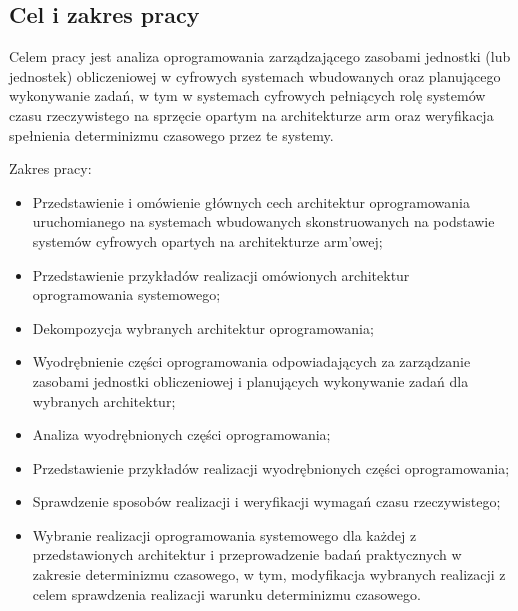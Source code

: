 \documentclass[../../main]{subfiles}
\begin{document}
\subsection{Cel i zakres pracy}

Celem pracy jest analiza oprogramowania zarządzającego zasobami jednostki (lub jednostek) obliczeniowej w cyfrowych systemach wbudowanych oraz planującego wykonywanie zadań, w tym w systemach cyfrowych pełniących rolę systemów czasu rzeczywistego na sprzęcie opartym na architekturze \acrshort{arm} oraz weryfikacja spełnienia determinizmu czasowego przez te systemy.

Zakres pracy:

\begin{itemize}
    \item Przedstawienie i omówienie głównych cech architektur oprogramowania uruchomianego na systemach wbudowanych skonstruowanych na podstawie systemów cyfrowych opartych na architekturze \acrshort{arm}'owej;
    \item Przedstawienie przykładów realizacji omówionych architektur oprogramowania systemowego;
    \item Dekompozycja wybranych architektur oprogramowania;
    \item Wyodrębnienie części oprogramowania odpowiadających za zarządzanie zasobami jednostki obliczeniowej i planujących wykonywanie zadań dla wybranych architektur;
    \item Analiza wyodrębnionych części oprogramowania;
    \item Przedstawienie przykładów realizacji wyodrębnionych części oprogramowania;
    \item Sprawdzenie sposobów realizacji i weryfikacji wymagań czasu rzeczywistego;
    \item Wybranie realizacji oprogramowania systemowego dla każdej z przedstawionych architektur i przeprowadzenie badań praktycznych w zakresie determinizmu czasowego, w tym, modyfikacja wybranych realizacji z celem sprawdzenia realizacji warunku determinizmu czasowego.
\end{itemize}
\end{document}
